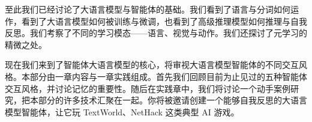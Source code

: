 至此我们已经讨论了大语言模型与智能体的基础。我们看到了语言与分词如何运作，看到了大语言模型如何被训练与微调，也看到了高级推理模型如何推理与自我反思。我们考察了不同的学习模态——语言、视觉与动作。我们还探讨了元学习的精微之处。 

现在我们来到了智能体大语言模型的核心，将审视大语言模型智能体的不同交互风格。本部分由一章内容与一章实践组成。首先我们回顾目前为止见过的五种智能体交互风格，并讨论记忆的重要性。随后在实践章中，我们将讨论一个动手案例研究，把本部分的许多技术汇聚在一起。你将被邀请创建一个能够自我反思的大语言模型智能体，让它玩 TextWorld、NetHack 这类典型 AI 游戏。
